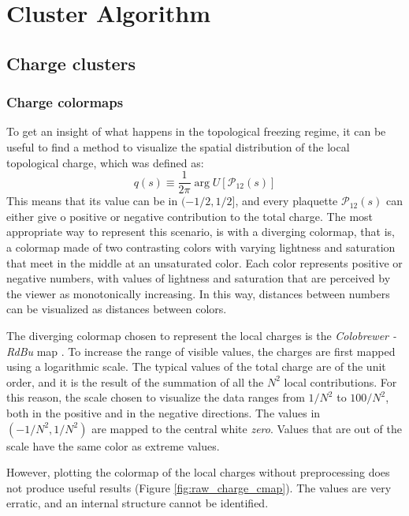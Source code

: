 \chapter{Cluster Algorithm}\label{ch:cluster}

\section{Charge clusters}

\subsection*{Charge colormaps}

To get an insight of what happens in the topological freezing regime,
it can be useful to find a method to visualize the spatial distribution of the local topological charge,
which was defined as:
\[
    q(s) \equiv \frac{1}{2\pi}\arg U[\mathcal P_{12}(s)]
\]
This means that its value can be in $(-1/2,1/2]$,
and every plaquette $\mathcal P_{12}(s)$ can either give o positive or negative contribution to the total charge.
The most appropriate way to represent this scenario, is with a diverging colormap, that is,
a colormap made of two contrasting colors with varying lightness and saturation that meet in the middle at an unsaturated color.
Each color represents positive or negative numbers,
with values of lightness and saturation that are perceived by the viewer as monotonically increasing.
In this way, distances between numbers can be visualized as distances between colors.

The diverging colormap chosen to represent the local charges is the \emph{Colobrewer - RdBu} map \cite{colorbrewer}.
To increase the range of visible values, the charges are first mapped using a logarithmic scale.
The typical values of the total charge are of the unit order, and it is the result of the summation of all the $N^2$ local contributions.
For this reason, the scale chosen to visualize the data ranges from $1/N^2$ to $100/N^2$, both in the positive and in the negative directions.
The values in $(-1/N^2,1/N^2)$ are mapped to the central white \emph{zero}. Values that are out of the scale have the same color as extreme values.

However, plotting the colormap of the local charges without preprocessing does not produce useful results (Figure \ref{fig:raw_charge_cmap}).
The values are very erratic, and an internal structure cannot be identified.

